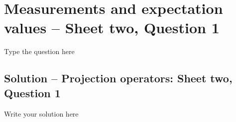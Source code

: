 \section{Measurements and expectation values -- Sheet two, Question 1}
Type  the question here


\subsection{Solution -- Projection operators: Sheet two, Question 1}

Write your solution here